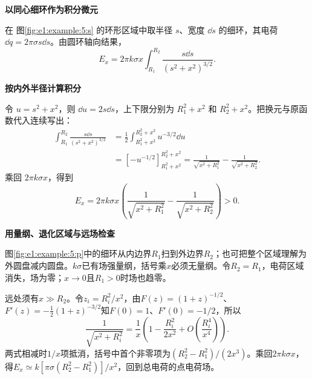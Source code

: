 \begin{solution}\textbf{以同心细环作为积分微元}\par\nobreak
在 图\ref{fig:e1:example:5:s} 的环形区域中取半径 $s$、宽度 $\dd s$ 的细环，其电荷 $\dd q=2\pi\sigma s\dd s$。由圆环轴向结果，
\[
 E_x=2\pi k\sigma x\int_{R_1}^{R_2}\frac{s\dd s}{(s^2+x^2)^{3/2}}.
\]


\par\medskip{}\noindent\textbf{按内外半径计算积分}\par\nobreak
令 $u=s^2+x^2$，则 $\dd u=2s\dd s$，上下限分别为
$R_1^2+x^2$ 和 $R_2^2+x^2$。把换元与原函数代入连续写出：
\begin{align*}
 \int_{R_1}^{R_2}\frac{s\dd s}{(s^2+x^2)^{3/2}}
 &=\frac12\int_{R_1^2+x^2}^{R_2^2+x^2}u^{-3/2}\dd u\\
 &=[-u^{-1/2}]_{R_1^2+x^2}^{R_2^2+x^2}
 =\frac1{\sqrt{x^2+R_1^2}}-\frac1{\sqrt{x^2+R_2^2}}.
\end{align*}
乘回 $2\pi k\sigma x$，得到
\[
 E_x=2\pi k\sigma x\left(\frac1{\sqrt{x^2+R_1^2}}-\frac1{\sqrt{x^2+R_2^2}}\right)>0.
\]



\par\medskip{}\noindent\textbf{用量纲、退化区域与远场检查}\par\nobreak
图\ref{fig:e1:example:5:p}中的细环从内边界$R_1$扫到外边界$R_2$；也可把整个区域理解为外圆盘减内圆盘。$k\sigma$已有场强量纲，括号乘$x$必须无量纲。令$R_2=R_1$，电荷区域消失，场为零；$x\to0$且$R_1>0$时场也趋零。

远处须有$x\gg R_2$。令$z_i=R_i^2/x^2$，由$F(z)=(1+z)^{-1/2}$、$F'(z)=-\tfrac12(1+z)^{-3/2}$知$F(0)=1$、$F'(0)=-1/2$，所以
\[
\frac1{\sqrt{x^2+R_i^2}}
=\frac1x\left(1-\frac{R_i^2}{2x^2}+O\!\left(\frac{R_i^4}{x^4}\right)\right).
\]
两式相减时$1/x$项抵消，括号中首个非零项为$(R_2^2-R_1^2)/(2x^3)$。乘回$2\pi k\sigma x$，得$E_x\simeq k[\pi\sigma(R_2^2-R_1^2)]/x^2$，回到总电荷的点电荷场。\end{solution}
